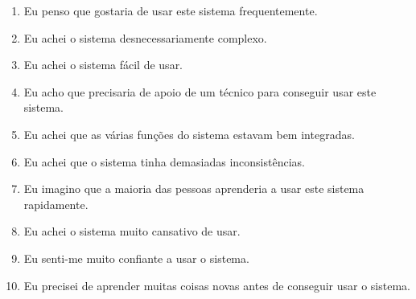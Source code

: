 \begin{enumerate}
    \item Eu penso que gostaria de usar este sistema frequentemente.
    \item Eu achei o sistema desnecessariamente complexo.
    \item Eu achei o sistema fácil de usar.
    \item Eu acho que precisaria de apoio de um técnico para conseguir usar este sistema.
    \item Eu achei que as várias funções do sistema estavam bem integradas.
    \item Eu achei que o sistema tinha demasiadas inconsistências.
    \item Eu imagino que a maioria das pessoas aprenderia a usar este sistema rapidamente.
    \item Eu achei o sistema muito cansativo de usar.
    \item Eu senti-me muito confiante a usar o sistema.
    \item Eu precisei de aprender muitas coisas novas antes de conseguir usar o sistema.
\end{enumerate}
